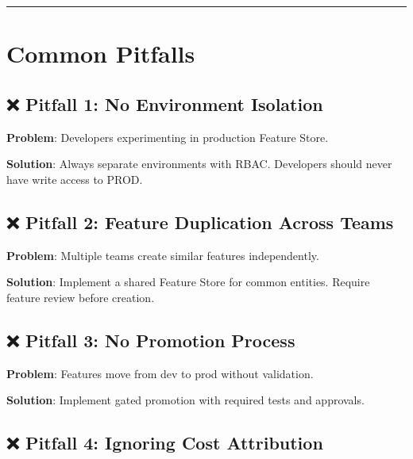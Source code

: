 \documentclass[
  letterpaper,
  DIV=11,
  numbers=noendperiod]{scrreprt}
\begin{document}
\begin{center}\rule{0.5\linewidth}{0.5pt}\end{center}

\hypertarget{common-pitfalls}{%
\section{Common Pitfalls}\label{common-pitfalls}}

\hypertarget{pitfall-1-no-environment-isolation}{%
\subsection{❌ Pitfall 1: No Environment
Isolation}\label{pitfall-1-no-environment-isolation}}

\textbf{Problem}: Developers experimenting in production Feature Store.

\textbf{Solution}: Always separate environments with RBAC. Developers
should never have write access to PROD.

\hypertarget{pitfall-2-feature-duplication-across-teams}{%
\subsection{❌ Pitfall 2: Feature Duplication Across
Teams}\label{pitfall-2-feature-duplication-across-teams}}

\textbf{Problem}: Multiple teams create similar features independently.

\textbf{Solution}: Implement a shared Feature Store for common entities.
Require feature review before creation.

\hypertarget{pitfall-3-no-promotion-process}{%
\subsection{❌ Pitfall 3: No Promotion
Process}\label{pitfall-3-no-promotion-process}}

\textbf{Problem}: Features move from dev to prod without validation.

\textbf{Solution}: Implement gated promotion with required tests and
approvals.

\hypertarget{pitfall-4-ignoring-cost-attribution}{%
\subsection{❌ Pitfall 4: Ignoring Cost
Attribution}\label{pitfall-4-ignoring-cost-attribution}}
\end{document}
